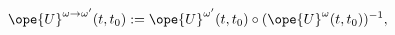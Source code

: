 \begin{equation}	\label{12.85new}
\ope{U}^{\omega\to\omega'} (t,t_0)
:=
\ope{U}^{\omega'} (t,t_0) \circ (\ope{U}^{\omega} (t,t_0) )^{-1},
	\end{equation}

